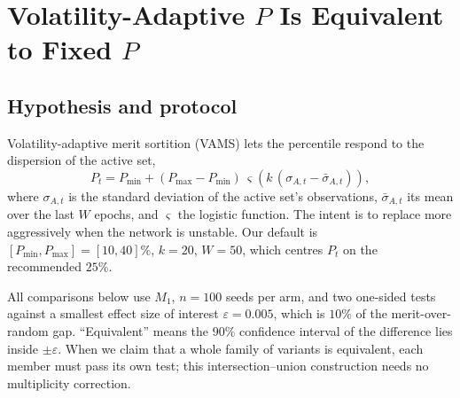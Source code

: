 \documentclass[sigconf,anonymous,review,nonacm]{acmart}
\begin{document}
\begin{table}[t]\centering\small
\caption{Bias per unit of churn (fit through the origin over all $P$ or $c$ and pools), and
the share of settings whose pivotality prediction lies inside the measurement's $95\%$
interval ($200$ seeds). The prediction is exact for UCB and neglects an $O(1/N_{\mathrm{act}})$
term for percentile sortition.}
\label{tab:pivot}
\setlength{\tabcolsep}{4pt}

\end{table}

\begin{table}[t]\centering\small
\caption{Percentile maximising $M_1$ $\to$ percentile maximising $M_2$, picked on $100$ seeds,
and (in brackets) the share of the gain over random selection lost by deploying the
$M_2$ pick, scored on $100$ disjoint seeds, in \%. $\sigma_Q=0.1$ throughout.}
\label{tab:shift}
\footnotesize\setlength{\tabcolsep}{1.6pt}

\end{table}

\section{Volatility-Adaptive $P$ Is Equivalent to Fixed $P$}
\label{sec:vams}

\subsection{Hypothesis and protocol}
Volatility-adaptive merit sortition (VAMS) lets the percentile respond to the dispersion
of the active set,
\begin{equation}\label{eq:vams}
P_t=P_{\min}+(P_{\max}-P_{\min})\,\varsigma\!\left(k\,(\sigma_{A,t}-\bar\sigma_{A,t})\right),
\end{equation}
where $\sigma_{A,t}$ is the standard deviation of the active set's observations,
$\bar\sigma_{A,t}$ its mean over the last $W$ epochs, and $\varsigma$ the logistic
function. The intent is to replace more aggressively when the network is unstable. Our
default is $[P_{\min},P_{\max}]=[10,40]\%$, $k=20$, $W=50$, which centres $P_t$ on the
recommended $25\%$.

All comparisons below use $M_1$, $n=100$ seeds per arm, and two one-sided tests against a
smallest effect size of interest $\varepsilon=0.005$, which is $10\%$ of the
merit-over-random gap. ``Equivalent'' means the $90\%$ confidence interval of the
difference lies inside $\pm\varepsilon$. When we claim that a whole family of variants is
equivalent, each member must pass its own test; this intersection--union construction needs
no multiplicity correction.
\end{document}
